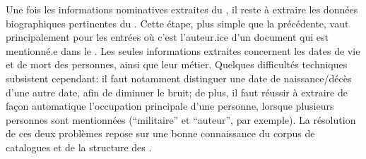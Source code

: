 Une fois les informations nominatives extraites du \tname{}, il reste à extraire les données biographiques pertinentes du \ttrait{}. Cette étape, plus simple que la précédente, vaut principalement pour les entrées où c'est l'auteur.ice d'un document qui est mentionné.e dans le \tname{}. Les seules informations extraites concernent les dates de vie et de mort des personnes, ainsi que leur métier. Quelques difficultés techniques subsistent cependant: il faut notamment distinguer une date de naissance/décès d'une autre date, afin de diminuer le bruit; de plus, il faut réussir à extraire de façon automatique l'occupation principale d'une personne, lorsque plusieurs personnes sont mentionnées (\enquote{militaire} et \enquote{auteur}, par exemple). La résolution de ces deux problèmes repose sur une bonne connaissance du corpus de catalogues et de la structure des \ttrait{}.

